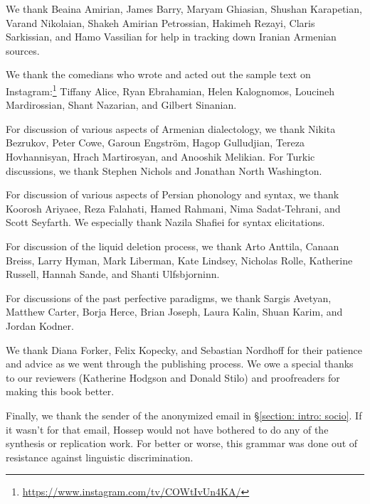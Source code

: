 We  thank Beaina Amirian, James Barry, Maryam Ghiasian, Shushan Karapetian, Varand Nikolaian,  Shakeh Amirian Petrossian,     Hakimeh Rezayi, Claris Sarkissian,  and Hamo Vassilian for help in tracking down Iranian Armenian sources. 

We thank the comedians who wrote and acted out the sample text on Instagram:\footnote{\url{https://www.instagram.com/tv/COWtIvUn4KA/}}  Tiffany Alice, Ryan Ebrahamian,   Helen Kalognomos,  Loucineh Mardirossian,  Shant Nazarian,  and Gilbert Sinanian. 
	
For discussion of various aspects of Armenian dialectology, we thank Nikita Bezrukov,  Peter Cowe, Garoun Engström,  Hagop Gulludjian,  Tereza Hovhannisyan,   Hrach Martirosyan, and Anooshik Melikian. For Turkic discussions, we thank   Stephen Nichols and Jonathan North Washington. 


For discussion of various aspects of Persian phonology and syntax, we thank Koorosh Ariyaee, Reza Falahati, Hamed Rahmani,  Nima Sadat-Tehrani, and Scott Seyfarth. We especially thank  Nazila Shafiei for syntax elicitations. 

For discussion of  the liquid deletion process, we thank Arto Anttila,  Canaan Breiss, Larry Hyman,  Mark Liberman, Kate Lindsey,  Nicholas Rolle, Katherine Russell, Hannah Sande, and Shanti Ulfsbjorninn. 


For discussions of the past perfective paradigms, we thank  Sargis Avetyan, Matthew Carter, Borja Herce, Brian Joseph, Laura Kalin, Shuan Karim, and Jordan Kodner. 

We thank Diana Forker, Felix Kopecky, and Sebastian Nordhoff for their patience and advice as we went through the publishing process. We owe a special thanks to our reviewers (Katherine Hodgson and Donald Stilo) and proofreaders for making this book better. 

Finally, we thank the sender of the anonymized email in \S\ref{section: intro: socio}. If it wasn't for that email, Hossep would not have bothered to do any of the synthesis or replication work. For better or worse, this grammar was done out of resistance against linguistic discrimination. 

